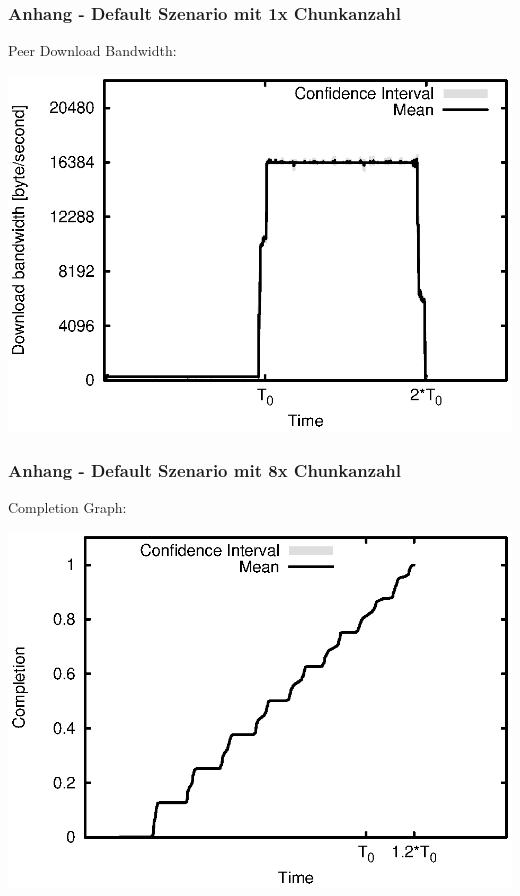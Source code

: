 \begin{frame}
  \frametitle{Anhang - Default Szenario mit 1x Chunkanzahl}
  Peer Download Bandwidth:
  
  \begin{center}
    \includegraphics[width=1\textwidth]{fig/plots/scenario_7_chunk_count_fac_1/plots/GeneratedMeanCurrentDownloadBandwidth.csv.eps}
  \end{center}
\end{frame}


\begin{frame}
  \frametitle{Anhang - Default Szenario mit 8x Chunkanzahl}
  Completion Graph:
  
  \begin{center}
    \includegraphics[width=1\textwidth]{fig/plots/scenario_16_chunk_count_fac_8/plots/GeneratedMeanChunkCompletion.csv.eps}
  \end{center}
\end{frame}


